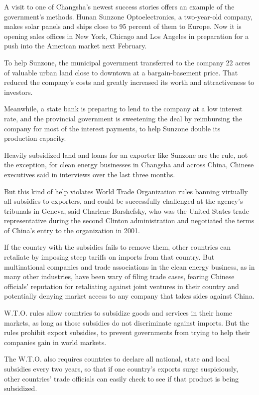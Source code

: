 ﻿\documentclass[12pt]{article}
\begin{document}
A visit to one of Changsha's newest success stories offers an example of the government's methods.
Hunan Sunzone Optoelectronics, a two-year-old company, makes solar panels and ships close to 95
percent of them to Europe. Now it is opening sales offices in New York, Chicago and Los Angeles in
preparation for a push into the American market next February.

To help Sunzone, the municipal government transferred to the company 22 acres of valuable urban land
close to downtown at a bargain-basement price. That reduced the company's costs and greatly
increased its worth and attractiveness to investors.

Meanwhile, a state bank is preparing to lend to the company at a low interest rate, and the
provincial government is sweetening the deal by reimbursing the company for most of the interest
payments, to help Sunzone double its production capacity.

Heavily subsidized land and loans for an exporter like Sunzone are the rule, not the exception, for
clean energy businesses in Changsha and across China, Chinese executives said in interviews over the
last three months.

But this kind of help violates World Trade Organization rules banning virtually all subsidies to
exporters, and could be successfully challenged at the agency's tribunals in Geneva, said Charlene
Barshefsky, who was the United States trade representative during the second Clinton administration
and negotiated the terms of China's entry to the organization in 2001.

If the country with the subsidies fails to remove them, other countries can retaliate by imposing
steep tariffs on imports from that country. But multinational companies and trade associations in
the clean energy business, as in many other industries, have been wary of filing trade cases,
fearing Chinese officials' reputation for retaliating against joint ventures in their country and
potentially denying market access to any company that takes sides against China.

W.T.O. rules allow countries to subsidize goods and services in their home markets, as long as those
subsidies do not discriminate against imports. But the rules prohibit export subsidies, to prevent
governments from trying to help their companies gain in world markets.

The W.T.O. also requires countries to declare all national, state and local subsidies every two
years, so that if one country's exports surge suspiciously, other countries' trade officials can
easily check to see if that product is being subsidized.
\end{document}
